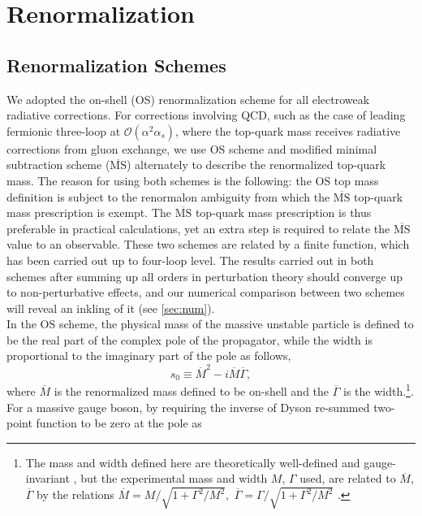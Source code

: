 \documentclass[Physsubmission, Phys]{SciPost}
\newcommand{\msbar}{$\overline{\mbox{MS}}$}
\begin{document}
\section{Renormalization}\label{sec:reno}
\subsection{Renormalization Schemes}\label{schemes}
We adopted the on-shell (OS) renormalization scheme for all electroweak radiative corrections. For corrections involving QCD, such as the case of leading fermionic three-loop at $\mathcal{O}(\alpha^2\alpha_s)$, where the top-quark mass receives radiative corrections from gluon exchange, we use OS scheme and modified minimal subtraction scheme ($\overline{\text{MS}}$) alternately to describe the renormalized top-quark mass. The reason for using both schemes is the following:  the OS top mass definition is subject to the renormalon ambiguity from which the $\overline{\text{MS}}$ top-quark mass prescription is exempt. The $\overline{\text{MS}}$ top-quark mass prescription is thus preferable in practical calculations, yet an extra step is required to relate the {\msbar} value to an observable. These two schemes are related by a finite function, which has been carried out up to four-loop level\cite{osmsbar}. %
The results carried out in both schemes after summing up all orders in perturbation theory should converge up to non-perturbative effects, and our numerical comparison between two schemes will reveal an inkling of it (see \ref{sec:num}).\\
In the OS scheme, the physical mass of the massive unstable particle is defined to be the real part of the complex pole of the propagator, while the width is proportional to the imaginary part of the pole as follows,
\begin{equation}
s_0\equiv \overline{M}^2-i \overline{M}\overline{\Gamma}\label{eq:pole},
\end{equation} 
where $\overline{M}$ is the renormalized mass defined to be on-shell and the $\overline{\Gamma}$ is the width.\footnote{The mass and width defined here are theoretically well-defined and gauge-invariant \cite{zpole}, but the experimental mass and width $M$, $\Gamma$ used, are related to $\overline{M}$, $\overline{\Gamma}$ by the relations 
$\overline{M} = M\big/\sqrt{1+\Gamma^2/M^2},$
$\overline{\Gamma} = \Gamma\big/\sqrt{1+\Gamma^2/M^2}$ \cite{mrel}.}.
For a massive gauge boson, by requiring the inverse of Dyson re-summed two-point function to be zero at the pole as
\end{document}
